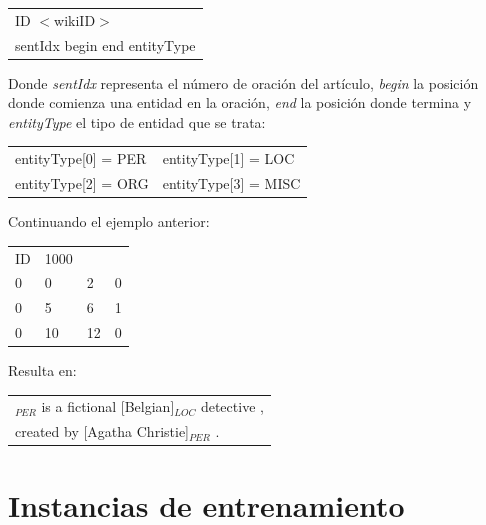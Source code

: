 \vspace{0.5em}

\begin{tabular}{|l|}
    \hline
    ID $<$wikiID$>$ \\
    sentIdx begin end entityType \\
    \hline
\end{tabular}

\vspace{1em}

Donde \textit{sentIdx} representa el número de oración del artículo, \textit{begin} la posición donde comienza una entidad en la oración, \textit{end} la posición donde termina y \textit{entityType} el tipo de entidad que se trata:

\vspace{0.5em}

\begin{tabular}{|ll|}
    \hline
    entityType[0] = PER & entityType[1] = LOC \\
    entityType[2] = ORG & entityType[3] = MISC \\
    \hline
\end{tabular}

\vspace{1em}

Continuando el ejemplo anterior:

\vspace{0.5em}

\begin{tabular}{|llll|}
    \hline
    ID & 1000 & & \\
    0 & 0 & 2 & 0 \\
    0 &	5 &	6 & 1 \\
    0 &	10 & 12 & 0 \\
    \hline
\end{tabular}

\vspace{1.0mm}

Resulta en:

\vspace{0.5em}

\begin{tabular}{|l|}
    \hline
    [Hercule Poirot]$_{PER}$ is a fictional [Belgian]$_{LOC}$ detective , \\
    created by [Agatha Christie]$_{PER}$ . \\
    \hline
\end{tabular}

\section{Instancias de entrenamiento}
\label{sec:instanciasEntrenamiento}

